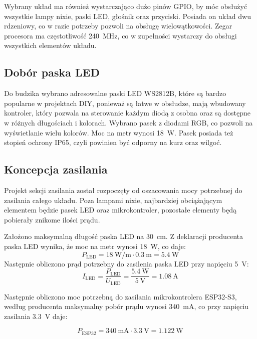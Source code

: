 \documentclass{article}
\begin{document}
Wybrany układ ma również wystarczająco dużo pinów GPIO, by móc obsłużyć wszystkie lampy nixie, paski LED, głośnik oraz przyciski.
Posiada on układ dwu rdzeniowy, co w razie potrzeby pozwoli na obsługę wielowątkowości. Zegar procesora ma częstotliwość \SI{240}{\mega\hertz},
co w zupełności wystarczy do obsługi wszystkich elementów układu.

\subsection{Dobór paska LED}
Do budzika wybrano adresowalne paski LED WS2812B, 
które są bardzo popularne w projektach DIY, ponieważ są łatwe w obsłudze, mają wbudowany kontroler,
który pozwala na sterowanie każdym diodą z osobna oraz są dostępne w różnych długościach i kolorach.
Wybrano pasek z diodami RGB, co pozwoli na wyświetlanie wielu kolorów. Moc na metr wynosi \SI{18}{\watt}.
Pasek posiada też stopień ochrony IP65, czyli powinien być odporny na kurz oraz wilgoć.

\subsection{Koncepcja zasilania}
Projekt sekcji zasilania został rozpoczęty od oszacowania mocy potrzebnej do zasilania całego układu.
Poza lampami nixie, najbardziej obciążającym elementem będzie pasek LED oraz mikrokontroler, pozostałe elementy będą pobierały znikome ilości prądu.

Założono maksymalną długość paska LED na \SI{30}{\centi\meter}. Z deklaracji producenta paska LED wynika, że moc na metr wynosi \SI{18}{\watt}, co daje:
\begin{equation}
    P_{\text{LED}} = \SI{18}{\watt\per\meter} \cdot \SI{0.3}{\meter} = \SI{5.4}{\watt}
\end{equation}
Następnie obliczono prąd potrzebny do zasilenia paska LED przy napięciu \SI{5}{\volt}:
\begin{equation}
    I_{\text{LED}} = \frac{P_{\text{LED}}}{U_{\text{LED}}} = \frac{\SI{5.4}{\watt}}{\SI{5}{\volt}} = \SI{1.08}{\ampere}
\end{equation}

Następnie obliczono moc potrzebną do zasilania mikrokontrolera ESP32-S3, według producenta maksymalny pobór prądu wynosi \SI{340}{\milli\ampere},
co przy napięciu zasilania \SI{3.3}{\volt} daje:

\begin{equation}
    P_{\text{ESP32}} = \SI{340}{\milli\ampere} \cdot \SI{3.3}{\volt} = \SI{1.122}{\watt}
\end{equation}
\end{document}
